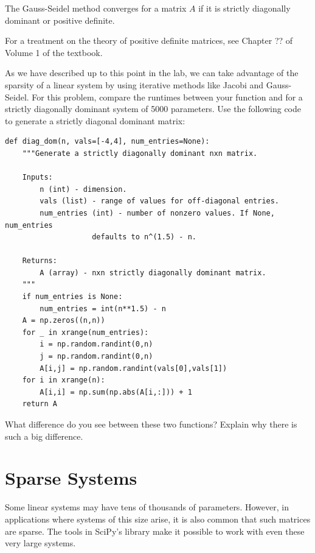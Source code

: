 \begin{theorem}
    The Gauss-Seidel method converges for a matrix $A$ if it is strictly
    diagonally dominant or positive definite.
\end{theorem}

For a treatment on the theory of positive definite matrices, see Chapter ?? of
Volume 1 of the textbook.

\begin{problem}
As we have described up to this point in the lab, we can take advantage of the
sparsity of a linear system by using iterative methods like Jacobi and Gauss-Seidel.
For this problem, compare the runtimes between your  function and
 for a strictly diagonally dominant system of 5000 parameters. Use the following
code to generate a strictly diagonal dominant matrix:
\begin{lstlisting}
def diag_dom(n, vals=[-4,4], num_entries=None):
    """Generate a strictly diagonally dominant nxn matrix.

    Inputs:
        n (int) - dimension.
        vals (list) - range of values for off-diagonal entries.
        num_entries (int) - number of nonzero values. If None, num_entries
                    defaults to n^(1.5) - n.

    Returns:
        A (array) - nxn strictly diagonally dominant matrix.
    """
    if num_entries is None:
        num_entries = int(n**1.5) - n
    A = np.zeros((n,n))
    for _ in xrange(num_entries):
        i = np.random.randint(0,n)
        j = np.random.randint(0,n)
        A[i,j] = np.random.randint(vals[0],vals[1])
    for i in xrange(n):
        A[i,i] = np.sum(np.abs(A[i,:])) + 1
    return A
\end{lstlisting}
What difference do you see between these two functions? Explain why there is such a big difference.
\end{problem}

\section*{Sparse Systems} %

Some linear systems may have tens of thousands of parameters.
However, in applications where systems of this size arise, it is also common
that such matrices are sparse.
The tools in SciPy's  library make it possible to work with even these very large systems.

